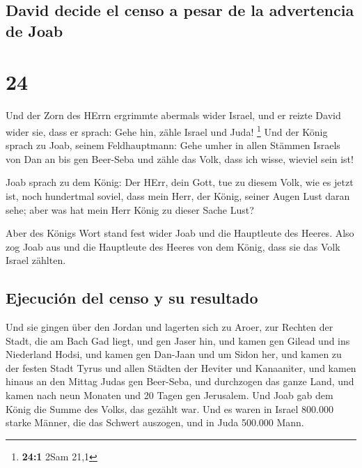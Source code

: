 \hypertarget{david-decide-el-censo-a-pesar-de-la-advertencia-de-joab}{%
\subsection{David decide el censo a pesar de la advertencia de
Joab}\label{david-decide-el-censo-a-pesar-de-la-advertencia-de-joab}}

\hypertarget{section-23}{%
\section{24}\label{section-23}}

 Und der Zorn des HErrn ergrimmte abermals wider Israel,
und er reizte David wider sie, dass er sprach: Gehe hin, zähle Israel
und Juda! \footnote{\textbf{24:1} 2Sam 21,1}  Und der
König sprach zu Joab, seinem Feldhauptmann: Gehe umher in allen Stämmen
Israels von Dan an bis gen Beer-Seba und zähle das Volk, dass ich wisse,
wieviel sein ist!

 Joab sprach zu dem König: Der HErr, dein Gott, tue zu
diesem Volk, wie es jetzt ist, noch hundertmal soviel, dass mein Herr,
der König, seiner Augen Lust daran sehe; aber was hat mein Herr König zu
dieser Sache Lust?

 Aber des Königs Wort stand fest wider Joab und die
Hauptleute des Heeres. Also zog Joab aus und die Hauptleute des Heeres
von dem König, dass sie das Volk Israel zählten.

\hypertarget{ejecuciuxf3n-del-censo-y-su-resultado}{%
\subsection{Ejecución del censo y su
resultado}\label{ejecuciuxf3n-del-censo-y-su-resultado}}

 Und sie gingen über den Jordan und lagerten sich zu
Aroer, zur Rechten der Stadt, die am Bach Gad liegt, und gen Jaser hin,
 und kamen gen Gilead und ins Niederland Hodsi, und kamen
gen Dan-Jaan und um Sidon her,  und kamen zu der festen
Stadt Tyrus und allen Städten der Heviter und Kanaaniter, und kamen
hinaus an den Mittag Judas gen Beer-Seba,  und durchzogen
das ganze Land, und kamen nach neun Monaten und 20 Tagen gen Jerusalem.
 Und Joab gab dem König die Summe des Volks, das gezählt
war. Und es waren in Israel 800.000 starke Männer, die das Schwert
auszogen, und in Juda 500.000 Mann.

